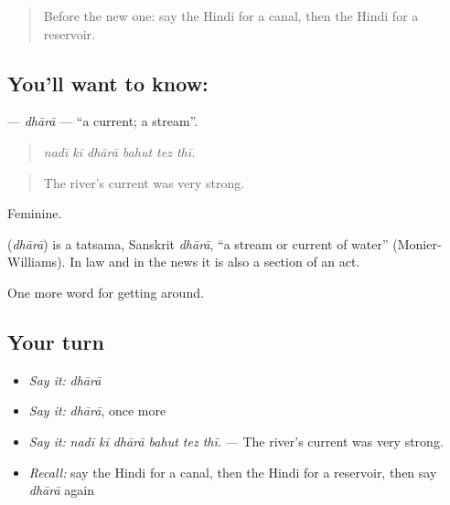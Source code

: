 \label{lesson:HI-C443-dhara}



\begin{quote}
Before the new one: say the Hindi for a canal, then the Hindi for a reservoir.
\end{quote}

\subsection*{You'll want to know: }
\textbf{} — \emph{dhārā} — \textquotedblleft{}a current; a stream\textquotedblright{}.

\begin{quote}
     
\end{quote}

\begin{quote}
\emph{nadī kī dhārā bahut tez thī.}
\end{quote}

\begin{quote}
The river's current was very strong.
\end{quote}

Feminine.

\begin{cousinweb}
\textbf{} (\emph{dhārā}) is a tatsama, Sanskrit \emph{dhārā}, \textquotedblleft{}a stream or current of water\textquotedblright{} (Monier-Williams). In law and in the news it is also a section of an act.
\end{cousinweb}

\begin{grammarlens}[title={What you've built}]
One more word for getting around.
\end{grammarlens}

\subsection*{Your turn}
\begin{itemize}
\raggedright
  \item \emph{Say it:} \emph{dhārā}
  \item \emph{Say it:} \emph{dhārā}, once more
  \item \emph{Say it:} \emph{nadī kī dhārā bahut tez thī.} — The river's current was very strong.
  \item \emph{Recall:} say the Hindi for a canal, then the Hindi for a reservoir, then say \emph{dhārā} again
\end{itemize}

